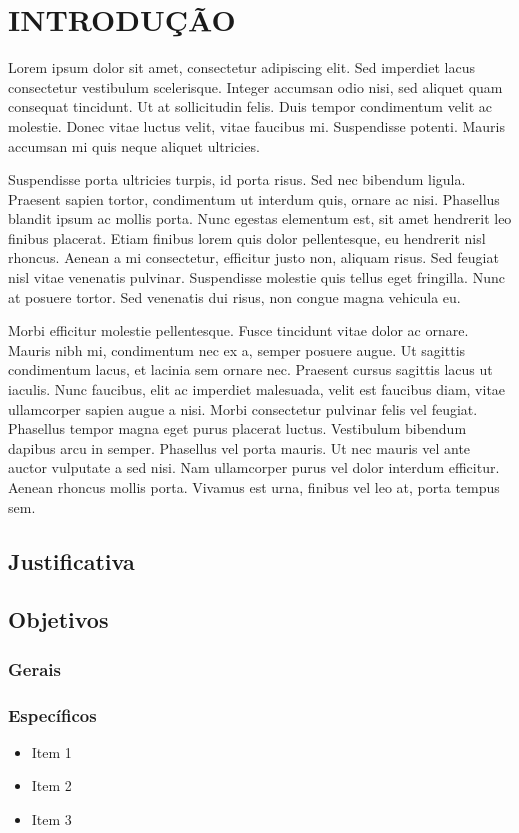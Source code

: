 \chapter{INTRODUÇÃO}
\label{cap:introducao}

 Lorem ipsum dolor sit amet, consectetur adipiscing elit. Sed imperdiet lacus consectetur vestibulum scelerisque. Integer accumsan odio nisi, sed aliquet quam consequat tincidunt. Ut at sollicitudin felis. Duis tempor condimentum velit ac molestie. Donec vitae luctus velit, vitae faucibus mi. Suspendisse potenti. Mauris accumsan mi quis neque aliquet ultricies.

Suspendisse porta ultricies turpis, id porta risus. Sed nec bibendum ligula. Praesent sapien tortor, condimentum ut interdum quis, ornare ac nisi. Phasellus blandit ipsum ac mollis porta. Nunc egestas elementum est, sit amet hendrerit leo finibus placerat. Etiam finibus lorem quis dolor pellentesque, eu hendrerit nisl rhoncus. Aenean a mi consectetur, efficitur justo non, aliquam risus. Sed feugiat nisl vitae venenatis pulvinar. Suspendisse molestie quis tellus eget fringilla. Nunc at posuere tortor. Sed venenatis dui risus, non congue magna vehicula eu.

Morbi efficitur molestie pellentesque. Fusce tincidunt vitae dolor ac ornare. Mauris nibh mi, condimentum nec ex a, semper posuere augue. Ut sagittis condimentum lacus, et lacinia sem ornare nec. Praesent cursus sagittis lacus ut iaculis. Nunc faucibus, elit ac imperdiet malesuada, velit est faucibus diam, vitae ullamcorper sapien augue a nisi. Morbi consectetur pulvinar felis vel feugiat. Phasellus tempor magna eget purus placerat luctus. Vestibulum bibendum dapibus arcu in semper. Phasellus vel porta mauris. Ut nec mauris vel ante auctor vulputate a sed nisi. Nam ullamcorper purus vel dolor interdum efficitur. Aenean rhoncus mollis porta. Vivamus est urna, finibus vel leo at, porta tempus sem. 

\section{Justificativa}


\section{Objetivos}
\subsection{Gerais}

\subsection{Específicos}
\begin{itemize}
    \item Item 1
    \item Item 2
    \item Item 3 
\end{itemize}


